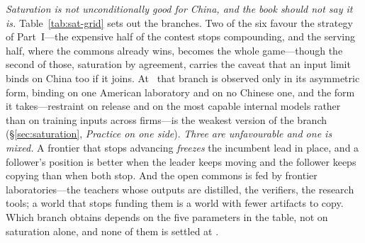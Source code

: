 \emph{Saturation is not unconditionally good for China, and the book should not say it is.} Table~\ref{tab:sat-grid} sets out the branches. Two of the six favour the strategy of Part~I---the expensive half of the contest stops compounding, and the serving half, where the commons already wins, becomes the whole game---though the second of those, saturation by agreement, carries the caveat that an input limit binds on China too if it joins. At \datafreeze\ that branch is observed only in its asymmetric form, binding on one American laboratory and on no Chinese one, and the form it takes---restraint on release and on the most capable internal models rather than on training inputs across firms---is the weakest version of the branch (\S\ref{sec:saturation}, \emph{Practice on one side}). \emph{Three are unfavourable and one is mixed.} A frontier that stops advancing \emph{freezes} the incumbent lead in place, and a follower's position is better when the leader keeps moving and the follower keeps copying than when both stop. And the open commons is fed by frontier laboratories---the teachers whose outputs are distilled, the verifiers, the research tools; a world that stops funding them is a world with fewer artifacts to copy. Which branch obtains depends on the five parameters in the table, not on saturation alone, and none of them is settled at \datafreeze.

